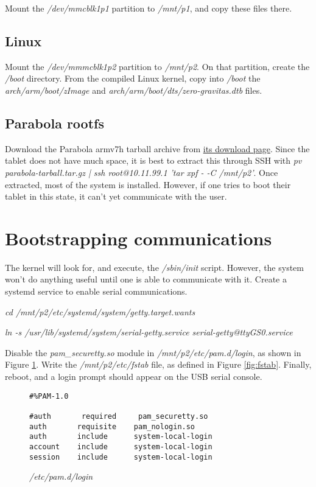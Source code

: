 \documentclass{memoir}
\begin{document}
Mount the \textit{/dev/mmcblk1p1} partition to \textit{/mnt/p1}, and copy these files there.

\subsection{Linux}
Mount the \textit{/dev/mmmcblk1p2} partition to \textit{/mnt/p2}. On that partition, create the \textit{/boot} directory. From the compiled Linux kernel, copy into \textit{/boot} the \textit{arch/arm/boot/zImage} and \textit{arch/arm/boot/dts/zero-gravitas.dtb} files.


\subsection{Parabola rootfs}
Download the Parabola armv7h tarball archive from \href{https://wiki.parabola.nu/Get_Parabola#Parabola_SystemD_CLI_Tarball_and_VM_Image}{its download page}. Since the tablet does not have much space, it is best to extract this through SSH with \textit{pv parabola-tarball.tar.gz | ssh root@10.11.99.1 'tar xpf - -C /mnt/p2'}. Once extracted, most of the system is installed. However, if one tries to boot their tablet in this state, it can't yet communicate with the user.


\section{Bootstrapping communications}
The kernel will look for, and execute, the \textit{/sbin/init} script. However, the system won't do anything useful until one is able to communicate with it. Create a systemd service to enable serial communications.

\vspace{0.5cm}
\textit{cd /mnt/p2/etc/systemd/system/getty.target.wants}

\vspace{0.5cm}
\textit{ln -s /usr/lib/systemd/system/serial-getty\@.service serial-getty@ttyGS0.service}

\vspace{0.5cm}

Disable the \textit{pam\_securetty.so} module in \textit{/mnt/p2/etc/pam.d/login}, as shown in Figure \ref{fig:pamsecurettydisabled}. Write the \textit{/mnt/p2/etc/fstab} file, as defined in Figure \ref{fig:fstab}. Finally, reboot, and a login prompt should appear on the USB serial console.

\begin{figure}[h]
\begin{verbatim}
#%PAM-1.0

#auth       required     pam_securetty.so
auth       requisite    pam_nologin.so
auth       include      system-local-login
account    include      system-local-login
session    include      system-local-login
\end{verbatim}
\caption{\textit{/etc/pam.d/login}}
\label{fig:pamsecurettydisabled}
\end{figure}
\end{document}
